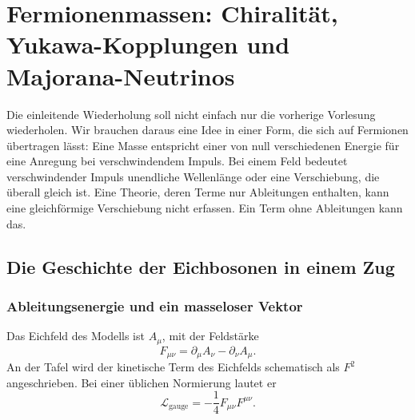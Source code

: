 \chapter{Fermionenmassen: Chiralität, Yukawa-Kopplungen und Majorana-Neutrinos}


Die einleitende Wiederholung soll nicht einfach nur die vorherige Vorlesung wiederholen. Wir brauchen daraus eine Idee in einer Form, die sich auf Fermionen übertragen lässt: Eine Masse entspricht einer von null verschiedenen Energie für eine Anregung bei verschwindendem Impuls. Bei einem Feld bedeutet verschwindender Impuls unendliche Wellenlänge oder eine Verschiebung, die überall gleich ist. Eine Theorie, deren Terme nur Ableitungen enthalten, kann eine gleichförmige Verschiebung nicht erfassen. Ein Term ohne Ableitungen kann das.

\section{Die Geschichte der Eichbosonen in einem Zug}

\subsection{Ableitungsenergie und ein masseloser Vektor}

Das Eichfeld des Modells ist \(A_\mu\), mit der Feldstärke
\begin{equation}
  F_{\mu\nu}
  =\partial_\mu A_\nu-\partial_\nu A_\mu .
  \label{eq:l09-field-strength}
\end{equation}
An der Tafel wird der kinetische Term des Eichfelds schematisch als \(F^2\) angeschrieben. Bei einer üblichen Normierung lautet er
\begin{equation}
  \mathcal L_{\mathrm{gauge}}
  =-\frac14 F_{\mu\nu}F^{\mu\nu}.
  \label{eq:l09-gauge-kinetic}
\end{equation}


